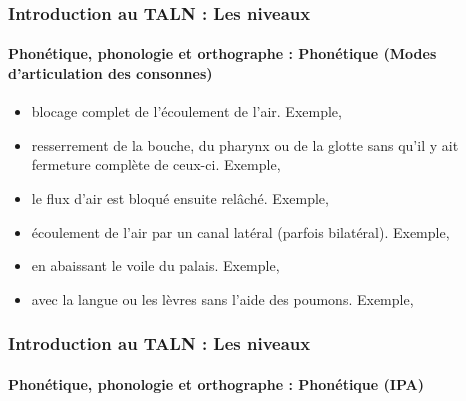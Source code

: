 \documentclass{beamer}
\begin{document}
\begin{frame}
\frametitle{Introduction au TALN : Les niveaux}
\framesubtitle{Phonétique, phonologie et orthographe : Phonétique (Modes d'articulation des consonnes)}

\begin{itemize}
	\item {} blocage complet de l'écoulement de l'air.
	Exemple, \expword{\textipa{[p], [k], [b], [m], [n]}}
	
	\item {} resserrement de la bouche, du pharynx ou de la glotte sans qu'il y ait fermeture complète de ceux-ci.
	Exemple, \expword{\textipa{[f], [v], [s]}}
	
	\item {} le flux d'air est bloqué ensuite relâché.
	Exemple, \expword{\textipa{[\t{\textteshlig}]}}
	
	\item {} écoulement de l'air par un canal latéral (parfois bilatéral).
	Exemple, \expword{\textipa{[l]}}
	
	\item {} en abaissant le voile du palais.
	Exemple, \expword{\textipa{[m], [n]}}
	
	\item {} avec la langue ou les lèvres sans l'aide des poumons.
	Exemple, 
	
\end{itemize}

\end{frame}

\begin{frame}
\frametitle{Introduction au TALN : Les niveaux}
\framesubtitle{Phonétique, phonologie et orthographe : Phonétique (IPA)}

\begin{center}
\end{center}

\end{frame}
\end{document}
